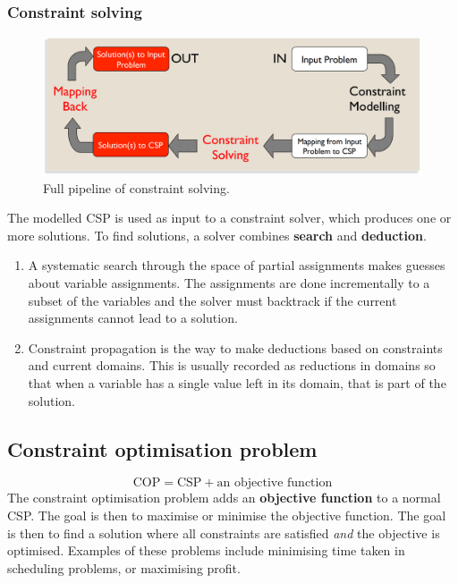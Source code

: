 \documentclass[CS4402-Notes.tex]{subfiles}
\begin{document}
\subsubsection{Constraint solving}
\begin{figure}[H]
\centering
\includegraphics[width=1\textwidth, keepaspectratio]{imgs/constraint-solving.png}
\caption{Full pipeline of constraint solving.}
\end{figure}
\noindent
The modelled CSP is used as input to a constraint solver, which produces one or more solutions. To find solutions, a solver combines \textbf{search} and \textbf{deduction}. 
\begin{enumerate}
\item A systematic search through the space of partial assignments makes guesses about variable assignments. The assignments are done incrementally to a subset of the variables and the solver must backtrack if the current assignments cannot lead to a solution.
\item Constraint propagation is the way to make deductions based on constraints and current domains. This is usually recorded as reductions in domains so that when a variable has a single value left in its domain, that is part of the solution. 
\end{enumerate} 

\subsection{Constraint optimisation problem}
\begin{equation}
\text{COP} = \text{CSP} + \text{an objective function}
\end{equation}
The constraint optimisation problem adds an \textbf{objective function} to a normal CSP. The goal is then to maximise or minimise the objective function. The goal is then to find a solution where all constraints are satisfied \textit{and} the objective is optimised. Examples of these problems include minimising time taken in scheduling problems, or maximising profit. 
\end{document}
